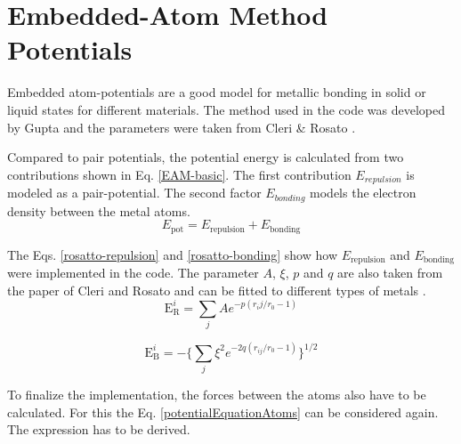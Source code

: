 \section{Embedded-Atom Method Potentials}
\begin{comment}
- describe Units 
- better discribed in the course
- good model for metalic systems
- work with gold clusters 

\end{comment}
Embedded atom-potentials are a good model for metallic bonding in solid or liquid states for different materials. The method used in the code was developed by Gupta \cite{gupta} and the parameters were taken from  Cleri \& Rosato \cite{rosato}. 
\par 
\begin{comment}
pair potentials cant model crystals as they have 3 independet elastic constants
put pair potentials have only two -> cauchy pressure
rather heuristic description in the lecture, like basic chemistry
E_pot = E_repulsion + E_embedding (embedding energy is connected to electric density)
E_repulustion is typically a pair potential
E_emedding is a funtiunal of the density in r
\end{comment}
Compared to pair potentials, the potential energy is calculated from two contributions shown in Eq. \ref{EAM-basic}. The first contribution $E_{repulsion}$ is modeled as a pair-potential. The second factor $E_{bonding}$ models the electron density between the metal atoms. 
\begin{equation}
	\label{EAM-basic}
	E_{\mathrm{pot}}  = E_{\mathrm{repulsion}} + E_{\mathrm{bonding}}
\end{equation}
 
The Eqs. \ref{rosatto-repulsion} and \ref{rosatto-bonding} show how $E_{\mathrm{repulsion}}$ and $E_{\mathrm{bonding}}$ were implemented in the code. The parameter $A$,  $\xi$, $p$ and $q$ are also taken from the paper of Cleri and Rosato and can be fitted to different types of metals \cite{rosato}. 
\begin{equation}
 	\label{rosatto-repulsion}
 	\mathrm{E}_{\mathrm{R}}^{i} = \sum_{j} A e^{-p(r_ij/r_{0} - 1)}
 \end{equation}

\begin{equation}
	\label{rosatto-bonding}
	\mathrm{E}_{\mathrm{B}}^{i} = - \big\{\sum_{j}\xi^{2} e^{-2q(r_{ij}/r_{0}-1)} \big\}^{1/2}
\end{equation}

To finalize the implementation, the forces between the atoms also have to be calculated. For this the Eq. \ref{potentialEquationAtoms} can be considered again. The expression has to be derived.
